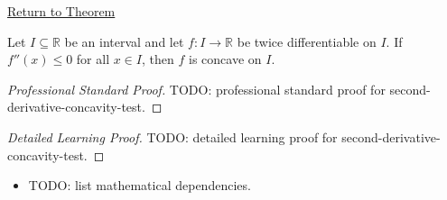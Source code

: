 \newpage
{}
\label{prf:second-derivative-concavity-test}

\begin{remark*}[Return]
\hyperref[thm:second-derivative-concavity-test]{Return to Theorem}
\end{remark*}

\begin{theorem*}
Let $I\subseteq\mathbb{R}$ be an interval and let $f:I\to\mathbb{R}$ be twice differentiable on $I$. If $f''(x)\leq 0$ for all $x\in I$, then $f$ is concave on $I$.
\end{theorem*}

\begin{proof}[Professional Standard Proof]
\LRAProofBodyStart
TODO: professional standard proof for second-derivative-concavity-test.
\end{proof}

\begin{proof}[Detailed Learning Proof]
\LRAProofBodyStart
TODO: detailed learning proof for second-derivative-concavity-test.
\end{proof}

\begin{remark*}
\end{remark*}

\begin{dependencies}
\begin{itemize}
  \item TODO: list mathematical dependencies.
\end{itemize}
\end{dependencies}

\clearpage
